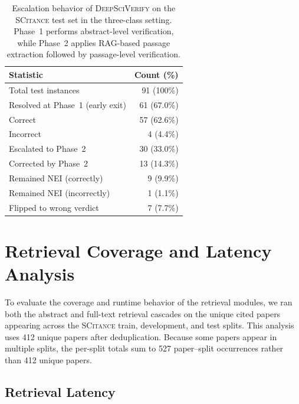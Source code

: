 \documentclass{article}
\theoremstyle{plain}
\theoremstyle{definition}
\theoremstyle{remark}
\begin{document}
\begin{table}[H]
  \centering\small
  \caption{Escalation behavior of \textsc{DeepSciVerify} on the \textsc{SCitance} test set in the three-class setting. Phase~1 performs abstract-level verification, while Phase~2 applies RAG-based passage extraction followed by passage-level verification.}
  \label{tab:escalation}
  \begin{tabularx}{\columnwidth}{@{} X r @{}}
    \toprule
    \textbf{Statistic} & \textbf{Count (\%)} \\
    \midrule
    Total test instances                & 91 (100\%) \\
    \addlinespace[4pt]
    Resolved at Phase~1 (early exit)    & 61 (67.0\%) \\
    \quad Correct                       & 57 (62.6\%) \\
    \quad Incorrect                     & 4 (4.4\%) \\
    \addlinespace[4pt]
    Escalated to Phase~2                & 30 (33.0\%) \\
    \quad Corrected by Phase~2          & 13 (14.3\%) \\
    \quad Remained NEI (correctly)      & 9 (9.9\%) \\
    \quad Remained NEI (incorrectly)    & 1 (1.1\%) \\
    \quad Flipped to wrong verdict      & 7 (7.7\%) \\
    \bottomrule
  \end{tabularx}
\end{table}

\section{Retrieval Coverage and Latency Analysis}
\label{app:retrieval_coverage_latency}

To evaluate the coverage and runtime behavior of the retrieval modules, we ran both the abstract and full-text retrieval cascades on the unique cited papers appearing across the \textsc{SCitance} train, development, and test splits. This analysis uses 412 unique papers after deduplication. Because some papers appear in multiple splits, the per-split totals sum to 527 paper--split occurrences rather than 412 unique papers.

\subsection{Retrieval Latency}
\label{app:retrieval_latency}
\end{document}
